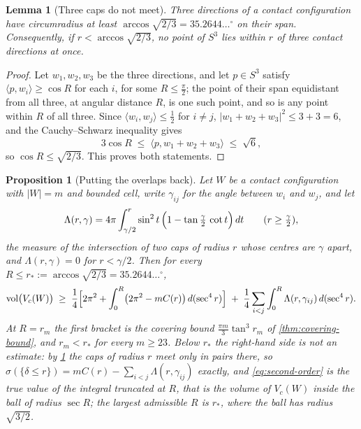 \documentclass[11pt,reqno]{amsart}
\renewcommand{\_}{\origunderscore\allowbreak}
\numberwithin{equation}{section}
\theoremstyle{plain}
\newtheorem{prop}[thm]{Proposition}
\newtheorem{lem}[thm]{Lemma}
\theoremstyle{definition}
\theoremstyle{remark}
\DeclareMathOperator{\vol}{vol}
\begin{document}
\begin{lem}[Three caps do not meet]\label{lem:no-triples}
Three directions of a contact configuration have circumradius at least
$\arccos\sqrt{2/3}=35.2644\ldots^\circ$ on their span. Consequently, if
$r<\arccos\sqrt{2/3}$, no point of $S^3$ lies within $r$ of three
contact directions at once.
\end{lem}

\begin{proof}
Let $w_1,w_2,w_3$ be the three directions, and let $p\in S^3$ satisfy
$\langle p,w_i\rangle\ge\cos R$ for each $i$, for some $R\le\frac\pi2$; the
point of their span equidistant from all three, at angular distance $R$, is
one such point, and so is any point within $R$ of all three. Since
$\langle w_i,w_j\rangle\le\tfrac12$ for $i\ne j$,
$|w_1+w_2+w_3|^2\le3+3=6$, and the Cauchy--Schwarz inequality gives
\[
  3\cos R\;\le\;\langle p,w_1+w_2+w_3\rangle\;\le\;\sqrt6 ,
\]
so $\cos R\le\sqrt{2/3}$. This proves both statements.
\end{proof}

\begin{prop}[Putting the overlaps back]\label{prop:second-order}
Let $W$ be a contact configuration with $|W|=m$ and bounded cell, write
$\gamma_{ij}$ for the angle between $w_i$ and $w_j$, and let
\begin{equation}\label{eq:lens}
  \Lambda(r,\gamma)=4\pi\int_{\gamma/2}^{r}
    \sin^2t\,\Bigl(1-\tan\tfrac{\gamma}{2}\,\cot t\Bigr)\,dt
  \qquad (r\ge\tfrac{\gamma}{2}),
\end{equation}
the measure of the intersection of two caps of radius $r$ whose centres
are $\gamma$ apart, and $\Lambda(r,\gamma)=0$ for $r<\gamma/2$. Then for
every $R\le r_*:=\arccos\sqrt{2/3}=35.2644\ldots^\circ$,
\begin{equation}\label{eq:second-order}
  \vol\bigl(V_c(W)\bigr)\;\ge\;
  \frac14\Bigl[2\pi^2+\int_0^{R}\bigl(2\pi^2-mC(r)\bigr)\,d(\sec^4r)\Bigr]
  \;+\;\frac14\sum_{i<j}\int_0^{R}\Lambda(r,\gamma_{ij})\,d(\sec^4r) .
\end{equation}
At $R=r_m$ the first bracket is the covering bound $\tfrac{\pi m}{3}\tan^3r_m$
of \cref{thm:covering-bound}, and $r_m<r_*$ for every $m\ge23$. Below
$r_*$ the right-hand side is not an estimate: by
\cref{lem:no-triples} the caps of radius $r$ meet only in pairs there, so
$\sigma(\{\delta\le r\})=mC(r)-\sum_{i<j}\Lambda(r,\gamma_{ij})$
exactly, and \eqref{eq:second-order} is the true value of the integral
truncated at $R$, that is the volume of $V_c(W)$ inside the ball of
radius $\sec R$; the largest admissible $R$ is $r_*$, where the ball has
radius $\sqrt{3/2}$.
\end{prop}
\end{document}
